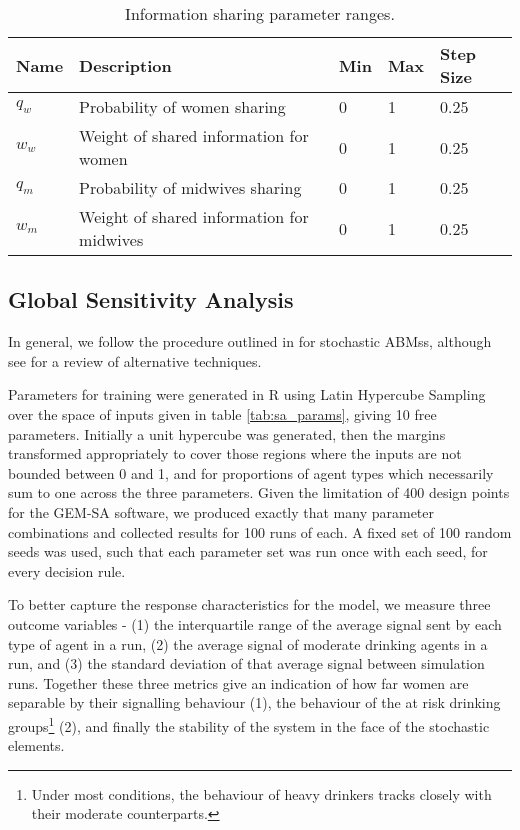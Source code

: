 \begin{table}
\center
\begin{tabular} {|l | l | l| l| l|}
\hline
Name & Description & Min & Max & Step Size \\ \hline
\(q_{w}\) & Probability of women sharing & 0 & 1 & 0.25 \\ \hline
\(w_{w}\) & Weight of shared information for women & 0 & 1 & 0.25 \\ \hline
\(q_{m}\) & Probability of midwives sharing & 0 & 1 & 0.25 \\ \hline
\(w_{m}\) & Weight of shared information for midwives & 0 & 1 & 0.25 \\ \hline
\end{tabular}
\caption[Table caption text]{Information sharing parameter ranges. \label{tab:sharing_params}}
\end{table}

\subsection{Global Sensitivity Analysis}
\label{sub:sensitivity}
In general, we follow the procedure outlined in \cite{Bijak2013b} for stochastic \acp{ABMs}, although see \citet{Thiele2014} for a review of alternative techniques.

Parameters for training were generated in R \citep{RTeam2014} using Latin Hypercube Sampling \citep{Carnell2012} over the space of inputs given in table \ref{tab:sa_params}, giving 10 free parameters. Initially a unit hypercube was generated, then the margins transformed appropriately to cover those regions where the inputs are not bounded between 0 and 1, and for proportions of agent types which necessarily sum to one across the three parameters. Given the limitation of 400 design points for the \ac{GEM-SA} software, we produced exactly that many parameter combinations and collected results for 100 runs of each. A fixed set of 100 random seeds was used, such that each parameter set was run once with each seed, for every decision rule.

To better capture the response characteristics for the model, we measure three outcome variables - (1) the interquartile range of the average signal sent by each type of agent in a run, (2) the average signal of moderate drinking agents in a run, and (3) the standard deviation of that average signal between simulation runs. Together these three metrics give an indication of how far women are separable by their signalling behaviour (1), the behaviour of the at risk drinking groups\footnote{Under most conditions, the behaviour of heavy drinkers tracks closely with their moderate counterparts.} (2), and finally the stability of the system in the face of the stochastic elements.

